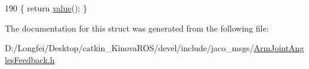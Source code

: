 \begin{DoxyCode}
190 \{ \textcolor{keywordflow}{return} \hyperlink{structros_1_1message__traits_1_1Definition_3_01_1_1jaco__msgs_1_1ArmJointAnglesFeedback___3_01ContainerAllocator_01_4_01_4_ac16eec284f4f7335505c277b9ed5f5c0}{value}(); \}
\end{DoxyCode}


The documentation for this struct was generated from the following file\+:\begin{DoxyCompactItemize}
\item 
D\+:/\+Longfei/\+Desktop/catkin\+\_\+\+Kinova\+R\+O\+S/devel/include/jaco\+\_\+msgs/\hyperlink{ArmJointAnglesFeedback_8h}{Arm\+Joint\+Angles\+Feedback.\+h}\end{DoxyCompactItemize}
